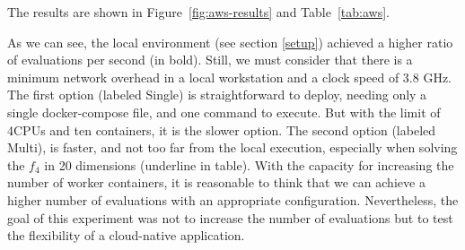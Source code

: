 \documentclass[review]{elsarticle}
\begin{document}
The results are shown in Figure~\ref{fig:aws-results} and Table~\ref{tab:aws}. 

As we can see, the local environment (see section \ref{setup}) achieved a higher
ratio of evaluations per second (in bold). Still, we must consider that there is a minimum
network overhead in a local workstation and a clock speed of 3.8 GHz. The first
option (labeled Single) is straightforward to deploy, needing only a single
docker-compose file, and one command to execute. But with the limit of 4CPUs and
ten containers, it is the slower option. The second option (labeled Multi), is
faster, and not too far from the local execution, especially when solving the
$f_4$ in 20 dimensions (underline in table). With the capacity for increasing the number of worker
containers, it is reasonable to think that we can achieve a higher number of
evaluations with an appropriate configuration. Nevertheless, the goal of this
experiment was not to increase the number of evaluations but to test the
flexibility of a cloud-native application.
\end{document}

